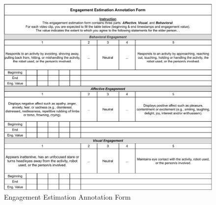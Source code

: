 \documentclass[10pt,journal,compsoc]{IEEEtran}
\begin{document}
\begin{figure}[ht]
  \centering
  \includegraphics[width=\linewidth]{assets/annotation_form.drawio}
  \caption{Engagement Estimation Annotation Form}
  \label{f:annotation_form}
\end{figure}



\ifCLASSOPTIONcaptionsoff
  \newpage
\fi





\end{document}
